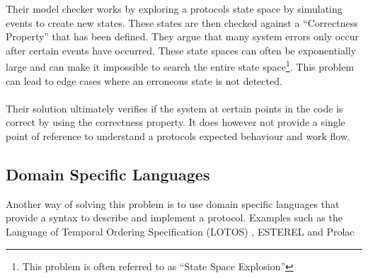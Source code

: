Their model checker works by exploring a protocols state space by simulating events to create new states. These states are then checked against a ``Correctness Property'' that has been defined. They argue that many system errors only occur after certain events have occurred. These state spaces can often be exponentially large and can make it impossible to search the entire state space\footnote{This problem is often referred to as ``State Space Explosion''}. This problem can lead to edge cases where an erroneous state is not detected.
\\\\
Their solution ultimately verifies if the system at certain points in the code is correct by using the correctness property. It does however not provide a single point of reference to understand a protocols expected behaviour and work flow.


\subsection{Domain Specific Languages}
Another way of solving this problem is to use domain specific languages that provide a syntax to describe and implement a protocol. Examples such as the Language of Temporal Ordering Specification  (LOTOS) \cite{bolognesi1987introduction}, ESTEREL \cite{boussinot1991esterel} and Prolac \cite{kohler1999readable}

